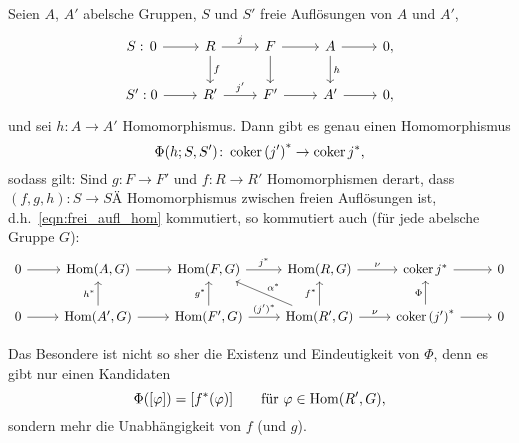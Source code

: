 \begin{prop}
  Seien $A$, $A'$ abelsche Gruppen, $S$ und $S'$ freie Auflösungen von $A$ und $A'$,
  \begin{equation*}
    \begin{tikzcd}
      S:\,0 \arrow{r}{} & R   \arrow{d}{f}
                              \arrow{r}{j}  & F   \arrow{d}{}
                                                  \arrow{r}{}   & A   \arrow{d}{h}
                                                                      \arrow{r}{} & 0, \\
      S': 0 \arrow{r}{} & R'  \arrow{r}{j'} & F'  \arrow{r}{}   & A'  \arrow{r}{} & 0,
    \end{tikzcd}
  \end{equation*}
  und sei $h\colon A \to A'$ Homomorphismus.
  Dann gibt es genau einen Homomorphismus
  \begin{equation*}
    \Phi(h;S,S') \colon \operatorname{coker} {(j')}^* \to \operatorname{coker} j^*,
  \end{equation*}
  sodass gilt: Sind $g \colon F \to F'$ und $f \colon R \to R'$ Homomorphismen derart, dass $(f,g,h) \colon S \to SÄ$ Homomorphismus zwischen freien Auflösungen ist, d.h.~\eqref{eqn:frei_aufl_hom} kommutiert, so kommutiert auch (für jede abelsche Gruppe $G$):
  \begin{equation*}
    \begin{tikzcd}
      0 \arrow{r}{}   & \Hom(A,G)   \arrow{r}{}   & \Hom(F,G) \arrow{r}{j^*}        & \Hom(R,G) \arrow{r}{\nu}  & \coker j^* \arrow{r}{}      & 0 \\
      0 \arrow{r}{}   & \Hom(A',G)  \arrow{u}{h^*}
                                    \arrow{r}{}   & \Hom(F',G)\arrow{u}{g^*}
                                                              \arrow{r}{{(j')}^*}  & \Hom(R',G) \arrow{u}{f^*}
                                                                                                \arrow[swap]{ul}{\alpha^*}
                                                                                                \arrow{r}{\nu} & \coker {(j')}^* \arrow{u}{\Phi}
                                                                                                                              \arrow{r}{} & 0
    \end{tikzcd}
  \end{equation*}
\end{prop}
\begin{kommentar}
  Das Besondere ist nicht so sher die Existenz und Eindeutigkeit von $\Phi$, denn es gibt nur einen Kandidaten
  \begin{equation*}
    \Phi([\varphi]) = [f^*(\varphi)]  \qquad \text{für } \varphi \in \mathrm{Hom}(R',G), 
  \end{equation*}
  sondern mehr die Unabhängigkeit von $f$ (und $g$).
\end{kommentar}

